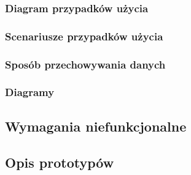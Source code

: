 \subsubsection{Diagram przypadków użycia}

\subsubsection{Scenariusze przypadków użycia}

\subsubsection{Sposób przechowywania danych}

\subsubsection{Diagramy}

\subsection{Wymagania niefunkcjonalne}

\subsection{Opis prototypów}


